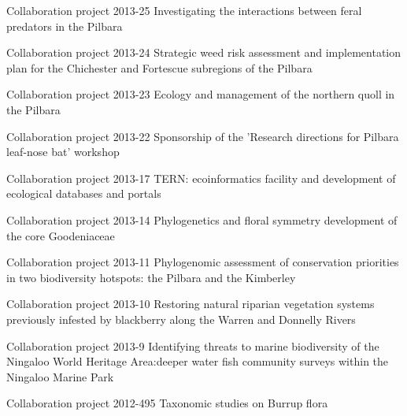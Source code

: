 \documentclass[version=last, paper=a4, DIV=18, usenames, dvipsnames]{scrartcl}
\begin{document}
\begin{longtabu}
  Collaboration project 2013-25 Investigating the interactions between feral predators in the Pilbara \newline  \\ \hline

  Collaboration project 2013-24 Strategic weed risk assessment and implementation plan for the Chichester and Fortescue subregions of the Pilbara \newline  \\ \hline

  Collaboration project 2013-23 Ecology and management of the northern quoll in the Pilbara \newline  \\ \hline

  Collaboration project 2013-22 Sponsorship of the 'Research directions for Pilbara leaf-nose bat' workshop \newline  \\ \hline

  Collaboration project 2013-17 TERN: ecoinformatics facility and development of ecological databases and portals \newline  \\ \hline

  Collaboration project 2013-14 Phylogenetics and floral symmetry development of the core Goodeniaceae \newline  \\ \hline

  Collaboration project 2013-11 Phylogenomic assessment of conservation priorities in two biodiversity hotspots: the Pilbara and the Kimberley \newline  \\ \hline

  Collaboration project 2013-10 Restoring natural riparian vegetation systems previously infested by blackberry along the Warren and Donnelly Rivers \newline  \\ \hline

  Collaboration project 2013-9 Identifying threats to marine biodiversity of the Ningaloo World Heritage Area:deeper water fish community surveys within the Ningaloo Marine Park \newline  \\ \hline

  Collaboration project 2012-495 Taxonomic studies on Burrup flora \newline  \\ \hline


\end{longtabu}
\end{document}
